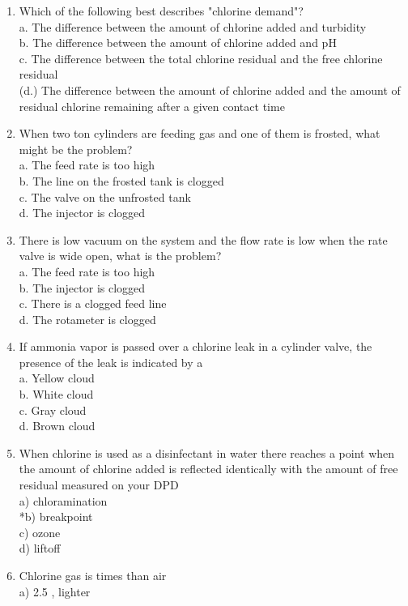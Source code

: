 \begin{enumerate}[1.]
\item Which of the following best describes "chlorine demand"?\\
a. The difference between the amount of chłorine added and turbidity\\
b. The difference between the amount of chlorine added and $\mathrm{pH}$\\
c. The difference between the total chlorine residual and the free chlorine residual\\
(d.) The difference between the amount of chlorine added and the amount of residual chlorine remaining after a given contact time\\
\item When two ton cylinders are feeding gas and one of them is frosted, what might be the problem?\\
a. The feed rate is too high\\
b. The line on the frosted tank is clogged\\
c. The valve on the unfrosted tank\\
d. The injector is clogged\\
\item There is low vacuum on the system and the flow rate is low when the rate valve is wide open, what is the problem?\\
a. The feed rate is too high\\
b. The injector is clogged\\
c. There is a clogged feed line\\
d. The rotameter is clogged 
\item If ammonia vapor is passed over a chlorine leak in a cylinder valve, the presence of the leak is indicated by a\\
a. Yellow cloud\\
b. White cloud\\
c. Gray cloud\\
d. Brown cloud
 \item When chlorine is used as a disinfectant in water there reaches a point when the amount of chlorine added is reflected identically with the amount of free residual measured on your DPD\\
a) chloramination\\
*b) breakpoint\\
c) ozone\\
d) liftoff\\
 \item Chlorine gas is times than air\\
a) 2.5 , lighter\\

\end{enumerate}
